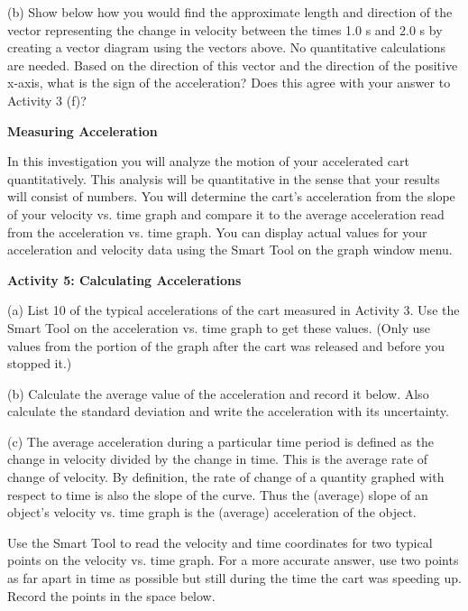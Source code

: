 (b) Show below how you would find the approximate length and direction of the
vector representing the change in velocity between the times 1.0 s and 2.0 s
by creating a vector diagram using the vectors above. No quantitative 
calculations are needed. Based on the
direction of this vector and the direction of the positive x-axis, what is the
sign of the acceleration? Does this agree with your answer to Activity 3 (f)?
\vspace{20mm}

\textbf{Measuring Acceleration }

In this investigation you will analyze the motion of your accelerated cart quantitatively.
This analysis will be quantitative in the sense that your results will consist
of numbers. You will determine the cart's acceleration from the slope of your
velocity vs. time graph and compare it to the average acceleration read from
the acceleration vs. time graph. You can display actual values for your acceleration
and velocity data using the Smart Tool on the graph window menu.

\textbf{Activity 5: Calculating Accelerations} 

(a) List 10 of the typical accelerations of the cart measured in Activity 3.
Use the Smart Tool on the acceleration vs. time graph to get these values. (Only
use values from the portion of the graph after the cart was released and before
you stopped it.)
\vspace{30mm}

(b) Calculate the average value of the acceleration and record it below.  Also calculate the standard deviation and write the acceleration with its uncertainty.
\vspace{30mm}

(c) The average acceleration during a particular time period is defined as the
change in velocity divided by the change in time. This is the average rate of
change of velocity. By definition, the rate of change of a quantity graphed
with respect to time is also the slope of the curve. Thus the (average) slope
of an object's velocity vs. time graph is the (average) acceleration of the
object.

Use the Smart Tool to read the velocity and time coordinates for two typical
points on the velocity vs. time graph. For a more accurate answer, use two points as far apart in time as possible but still during the time the cart was speeding up. Record the points in the space below.
\vspace{20mm}

